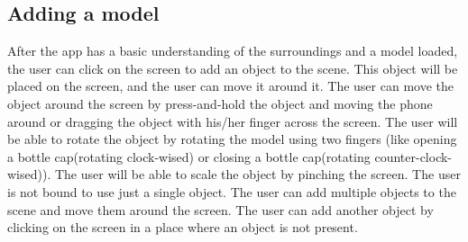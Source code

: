 \pagebreak

\subsection{Adding a model}
After the app has a basic understanding of the surroundings and a model loaded, the user can click on the screen to add an object to the scene. This object will be placed on the screen, and the user can move it around it. The user can move the object around the screen by press-and-hold the object and moving the phone around or dragging the object with his/her finger across the screen. The user will be able to rotate the object by rotating the model using two fingers (like opening a bottle cap(rotating clock-wised) or closing a bottle cap(rotating counter-clock-wised)). The user will be able to scale the object by pinching the screen. The user is not bound to use just a single object. The user can add multiple objects to the scene and move them around the screen. The user can add another object by clicking on the screen in a place where an object is not present.
